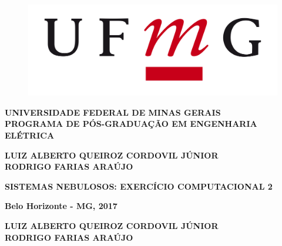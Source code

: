 \documentclass[12pt,a4paper]{article}
\numberwithin{equation}{section}
\begin{document}

\thispagestyle{empty}
\hspace{-1cm}
\begin{minipage}{0.35\textwidth}
\vspace{-2cm}
  \begin{figure}[H]
    \includegraphics[scale=0.07]{figures/UFMG-logo.png}
  \end{figure}
\end{minipage}
\begin{minipage}{0.7\textwidth}
\textbf{UNIVERSIDADE FEDERAL DE MINAS GERAIS} \\
\textbf{PROGRAMA DE PÓS-GRADUAÇÃO EM ENGENHARIA ELÉTRICA}\\
\end{minipage}


\vspace{30mm}
\begin{center}
\textbf{
LUIZ ALBERTO QUEIROZ CORDOVIL JÚNIOR \\
RODRIGO FARIAS ARAÚJO}
\end{center}

\vspace{50 mm}
\begin{center}
\textbf{SISTEMAS NEBULOSOS: EXERCÍCIO COMPUTACIONAL 2}\\
\end{center}

\vspace{85mm}

\begin{center}
\textbf{Belo Horizonte - MG, 2017}
\end{center}
\thispagestyle{empty}
\newpage


\thispagestyle{empty}

\vspace{3 mm}
\begin{center}
\textbf{
LUIZ ALBERTO QUEIROZ CORDOVIL JÚNIOR \\
RODRIGO FARIAS ARAÚJO}
\end{center}
\end{document}
